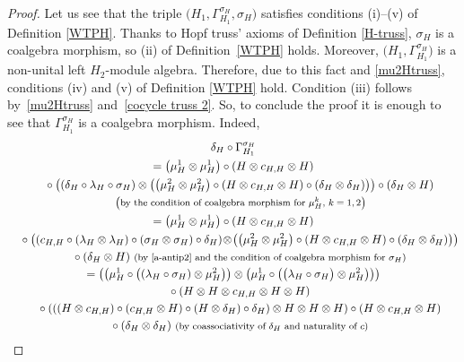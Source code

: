 \documentclass[pdftex]{sigma}
\numberwithin{equation}{section}
\begin{document}
\begin{proof} Let us see that the triple $\bigl(H_{1},\Gamma_{H_{1}}^{\sigma_{H}},\sigma_{H}\bigr)$ satisfies conditions (i)--(v) of Definition \ref{WTPH}. Thanks to Hopf truss' axioms of Definition \ref{H-truss}, $\sigma_{H}$ is a coalgebra morphism, so (ii) of Definition~\ref{WTPH} holds. Moreover, $\bigl(H_{1}, \Gamma_{H_{1}}^{\sigma_{H}}\bigr)$ is a non-unital left $H_{2}$-module algebra. Therefore, due to this fact and \eqref{mu2Htruss}, conditions (iv) and (v) of Definition \ref{WTPH} hold. Condition (iii) follows by~\eqref{mu2Htruss} and~\eqref{cocycle truss 2}. So, to conclude the proof it is enough to see that $\Gamma_{H_{1}}^{\sigma_{H}}$ is a coalgebra morphism. Indeed,
\begin{gather*}
 \delta_{H}\circ\Gamma_{H_{1}}^{\sigma_{H}} \\
 =\bigl(\mu_{H}^{1}\otimes\mu_{H}^{1}\bigr)\circ(H\otimes c_{H,H}\otimes H) \\
 \quad{} \circ\bigl((\delta_{H}\circ\lambda_{H}\circ\sigma_{H})\otimes\bigl(\bigl(\mu_{H}^{2}\otimes\mu_{H}^{2}\bigr)\circ(H\otimes c_{H,H}\otimes H)\circ(\delta_{H}\otimes\delta_{H})\bigr)\bigr)\circ(\delta_{H}\otimes H)\\
 \quad{}\;\text{\footnotesize\textnormal{\big(by the condition of coalgebra morphism for $\mu_{H}^{k}$, $k=1,2$\big)}} \\
 =\bigl(\mu_{H}^{1}\otimes\mu_{H}^{1}\bigr)\circ(H\otimes c_{H,H}\otimes H)\\
 \quad{}\circ\bigl((c_{H,H}\circ(\lambda_{H}\otimes\lambda_{H})\circ(\sigma_{H}\otimes\sigma_{H})\circ\delta_{H})\!\otimes\!\bigl(\bigl(\mu_{H}^{2}\otimes\mu_{H}^{2}\bigr)
\circ(H\otimes c_{H,H}\otimes H)\circ (\delta_{H}\otimes\delta_{H})\bigr)\bigr)\\
 \quad{}\circ(\delta_{H}\otimes H)\ \text{\footnotesize\textnormal{(by \eqref{a-antip2} and the condition of coalgebra morphism for $\sigma_{H}$)}} \\ =\bigl(\bigl(\mu_{H}^{1}\circ\bigl((\lambda_{H}\circ\sigma_{H})\otimes\mu_{H}^{2}\bigr)\bigr)\otimes\bigl(\mu_{H}^{1}\circ\bigl(\bigl(\lambda_{H}\circ\sigma_{H}\bigr)\otimes\mu_{H}^{2}\bigr)\bigr)\bigr)\\
 \quad{}\circ(H\otimes H\otimes c_{H,H}\otimes H\otimes H) \\
 \quad{}\circ(((H\otimes c_{H,H})\circ(c_{H,H}\otimes H)\circ(H\otimes\delta_{H})\circ\delta_{H})\otimes H\otimes H\otimes H)\circ(H\otimes c_{H,H}\otimes H)\\
 \quad{}\circ(\delta_{H}\otimes\delta_{H})\ \text{\footnotesize\textnormal{(by coassociativity of $\delta_{H}$ and naturality of $c$)}} \\

\end{gather*}
\end{proof}
\end{document}
